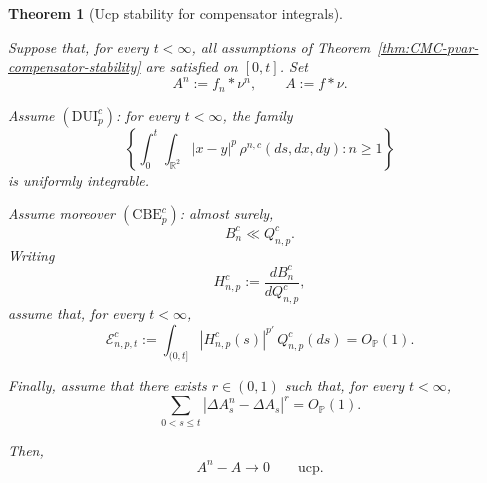 \documentclass[a4paper,10pt]{article}
\newtheorem{thm}{Theorem}[section]
\begin{document}
\begin{thm}
[Ucp stability for compensator integrals]
\label{thm:CMC-p-variation-compensator-ucp}


Suppose that, for every \(t<\infty\), all assumptions of
Theorem~\ref{thm:CMC-pvar-compensator-stability}
are satisfied on \([0,t]\). Set
\[
        A^n:=f_n*\nu^n,
        \qquad
        A:=f*\nu.
\]




Assume \((\mathrm{DUI}_p^c)\): for every \(t<\infty\), the family
\[
\left\{
        \int_0^t\int_{\mathbb R^2}
        |x-y|^p\,\rho^{n,c}(ds,dx,dy)
        :n\ge1
\right\}
\]
is uniformly integrable.

Assume moreover \((\mathrm{CBE}_p^c)\): almost surely,
\[
        B_n^c\ll Q_{n,p}^c.
\]
Writing
\[
        H_{n,p}^c
        :=
        \frac{dB_n^c}{dQ_{n,p}^c},
\]
assume that, for every \(t<\infty\),
\[
        \mathcal E_{n,p,t}^c
        :=
        \int_{(0,t]}
        |H_{n,p}^c(s)|^{p'}\,Q_{n,p}^c(ds)
        =
        O_{\mathbb P}(1).
\]

Finally, assume that there exists \(r\in(0,1)\) such that, for every
\(t<\infty\),
\[
\sum_{0<s\le t}
|\Delta A^n_s-\Delta A_s|^r
=
O_{\mathbb P}(1).
\]

Then,
\[
        A^n-A\longrightarrow0
        \qquad\text{ucp}.
\]

\end{thm}
\end{document}
